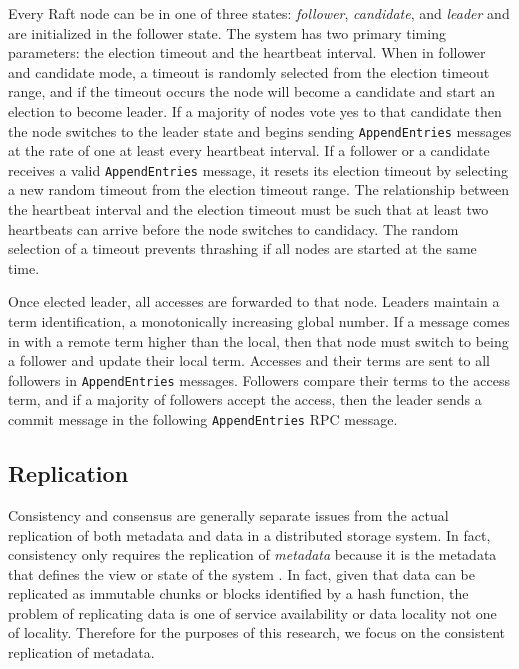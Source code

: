 \documentclass{article}
\begin{document}
Every Raft node can be in one of three states: \textit{follower}, \textit{candidate}, and \textit{leader} and are initialized in the follower state. The system has two primary timing parameters: the election timeout and the heartbeat interval. When in follower and candidate mode, a timeout is randomly selected from the election timeout range, and if the timeout occurs the node will become a candidate and start an election to become leader. If a majority of nodes vote yes to that candidate then the node switches to the leader state and begins sending \texttt{AppendEntries} messages at the rate of one at least every heartbeat interval. If a follower or a candidate receives a valid \texttt{AppendEntries} message, it resets its election timeout by selecting a new random timeout from the election timeout range. The relationship between the heartbeat interval and the election timeout must be such that at least two heartbeats can arrive before the node switches to candidacy. The random selection of a timeout prevents thrashing if all nodes are started at the same time.

Once elected leader, all accesses are forwarded to that node. Leaders maintain a term identification, a monotonically increasing global number. If a message comes in with a remote term higher than the local, then that node must switch to being a follower and update their local term. Accesses and their terms are sent to all followers in \texttt{AppendEntries} messages. Followers compare their terms to the access term, and if a majority of followers accept the access, then the leader sends a commit message in the following \texttt{AppendEntries} RPC message.


\subsection{Replication}

Consistency and consensus are generally separate issues from the actual replication of both metadata and data in a distributed storage system. In fact, consistency only requires the replication of \emph{metadata} because it is the metadata that defines the view or state of the system \cite{chandy_distributed_1985}. In fact, given that data can be replicated as immutable chunks or blocks identified by a hash function, the problem of replicating data is one of service availability \cite{venkataramani_operating_2002} or data locality \cite{kuenning_automated_1997} not one of locality. Therefore for the purposes of this research, we focus on the consistent replication of metadata.
\end{document}
